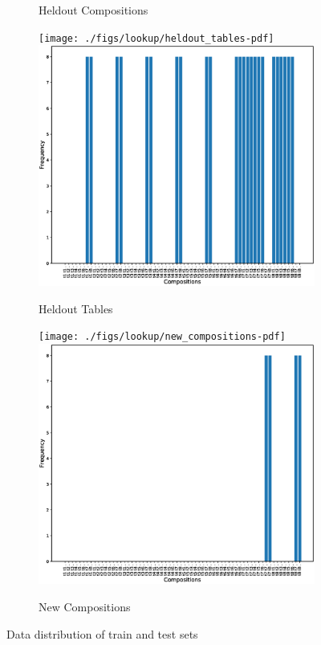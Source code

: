 \begin{figure}[ht]
\begin{subfigure}{0.5\linewidth}
		\fi
		\caption{Heldout Compositions}\label{fig:held_comp}
	\end{subfigure}
	\begin{subfigure}{0.5\linewidth}
		\ifpdf
		\texttt{[image: ./figs/lookup/heldout\_tables-pdf]}
		\else
		\includegraphics[width=0.95\linewidth]{./figs/lookup/heldout_tables-eps}
		\fi
		\caption{Heldout Tables}\label{fig:held_tab}
	\end{subfigure}
	\begin{subfigure}{0.5\linewidth}
		\ifpdf
		\texttt{[image: ./figs/lookup/new\_compositions-pdf]}
		\else
		\includegraphics[width=0.95\linewidth]{./figs/lookup/new_compositions-eps}
		\fi
		\caption{New Compositions}\label{fig:new_comp}
	\end{subfigure}
	\caption{Data distribution of train and test sets}\label{fig:all_data}
\end{figure}
